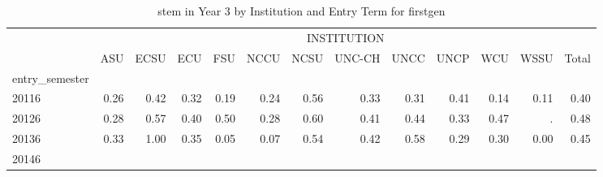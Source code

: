 \begin{table}[!h]
\caption{stem in Year 3 by Institution and Entry Term for firstgen}
\centering
\begin{tabular}{lllllllllllll}
\cline{1-13}
\multicolumn{1}{c}{} &
  \multicolumn{12}{|c}{INSTITUTION} \\
\multicolumn{1}{c}{} &
  \multicolumn{1}{|r}{ASU} &
  \multicolumn{1}{r}{ECSU} &
  \multicolumn{1}{r}{ECU} &
  \multicolumn{1}{r}{FSU} &
  \multicolumn{1}{r}{NCCU} &
  \multicolumn{1}{r}{NCSU} &
  \multicolumn{1}{r}{UNC-CH} &
  \multicolumn{1}{r}{UNCC} &
  \multicolumn{1}{r}{UNCP} &
  \multicolumn{1}{r}{WCU} &
  \multicolumn{1}{r}{WSSU} &
  \multicolumn{1}{r}{Total} \\
\cline{1-13}
\multicolumn{1}{l}{entry\_semester} &
  \multicolumn{1}{|r}{} &
  \multicolumn{1}{r}{} &
  \multicolumn{1}{r}{} &
  \multicolumn{1}{r}{} &
  \multicolumn{1}{r}{} &
  \multicolumn{1}{r}{} &
  \multicolumn{1}{r}{} &
  \multicolumn{1}{r}{} &
  \multicolumn{1}{r}{} &
  \multicolumn{1}{r}{} &
  \multicolumn{1}{r}{} &
  \multicolumn{1}{r}{} \\
\multicolumn{1}{l}{\hspace{1em}20116} &
  \multicolumn{1}{|r}{0.26} &
  \multicolumn{1}{r}{0.42} &
  \multicolumn{1}{r}{0.32} &
  \multicolumn{1}{r}{0.19} &
  \multicolumn{1}{r}{0.24} &
  \multicolumn{1}{r}{0.56} &
  \multicolumn{1}{r}{0.33} &
  \multicolumn{1}{r}{0.31} &
  \multicolumn{1}{r}{0.41} &
  \multicolumn{1}{r}{0.14} &
  \multicolumn{1}{r}{0.11} &
  \multicolumn{1}{r}{0.40} \\
\multicolumn{1}{l}{\hspace{1em}20126} &
  \multicolumn{1}{|r}{0.28} &
  \multicolumn{1}{r}{0.57} &
  \multicolumn{1}{r}{0.40} &
  \multicolumn{1}{r}{0.50} &
  \multicolumn{1}{r}{0.28} &
  \multicolumn{1}{r}{0.60} &
  \multicolumn{1}{r}{0.41} &
  \multicolumn{1}{r}{0.44} &
  \multicolumn{1}{r}{0.33} &
  \multicolumn{1}{r}{0.47} &
  \multicolumn{1}{r}{.} &
  \multicolumn{1}{r}{0.48} \\
\multicolumn{1}{l}{\hspace{1em}20136} &
  \multicolumn{1}{|r}{0.33} &
  \multicolumn{1}{r}{1.00} &
  \multicolumn{1}{r}{0.35} &
  \multicolumn{1}{r}{0.05} &
  \multicolumn{1}{r}{0.07} &
  \multicolumn{1}{r}{0.54} &
  \multicolumn{1}{r}{0.42} &
  \multicolumn{1}{r}{0.58} &
  \multicolumn{1}{r}{0.29} &
  \multicolumn{1}{r}{0.30} &
  \multicolumn{1}{r}{0.00} &
  \multicolumn{1}{r}{0.45} \\
\multicolumn{1}{l}{\hspace{1em}20146} &

\end{tabular}
\end{table}
